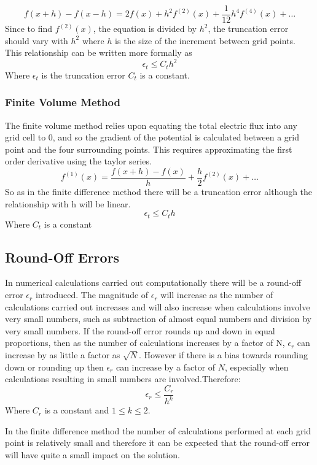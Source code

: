 \documentclass[aps,twocolumn,pre,nofootinbib,10pt]{revtex4-1}
\begin{document}
\[f(x+h)-f(x-h) = 2f(x) + h^2f^{(2)}(x) + \frac{1}{12}h^4f^{(4)}(x) + \dots \]
Since to find \(f^{(2)}(x) \), the equation is divided by \(h^2\), the truncation error should vary with \(h^2\) where \(h\) is the size of the increment between grid points. This relationship can be written more formally as
\[\epsilon_{t} \leq C_th^2 \]
Where \(\epsilon_{t}\) is the truncation error \(C_t\) is a constant.



\subsubsection{Finite Volume Method}

The finite volume method relies upon equating the total electric flux into any grid cell to 0, and so the gradient of the potential is calculated between a grid point and the four surrounding points. This requires approximating the first order derivative using the taylor series.
\[f^{(1)}(x) = \frac{f(x+h) - f(x)}{h} + \frac{h}{2}f^{(2)}(x) + \dots\]
So as in the finite difference method there will be a truncation error although the relationship with h will be linear.
\[\epsilon_t \leq C_th \]
Where \(C_t\) is a constant



\subsection{Round-Off Errors}

In numerical calculations carried out computationally there will be a round-off error \(\epsilon_r\) introduced. The magnitude of \(\epsilon_r\) will increase as the number of calculations carried out increases and will also increase when calculations involve very small numbers, such as subtraction of almost equal numbers and division by very small numbers. If the round-off error rounds up and down in equal proportions, then as the number of calculations increases by a factor of N, \(\epsilon_r\) can increase by as little a factor as \(\sqrt{N}.\) However if there is a bias towards rounding down or rounding up then \(\epsilon_r\) can increase by a factor of \(N\), especially when calculations resulting in small numbers are involved.Therefore: 
\[\epsilon_r \leq \frac{C_r}{h^k} \]\cite[p.~29]{recipes_c}
Where \(C_r\) is a constant and \(1 \leq k \leq 2\).

In the finite difference method the number of calculations performed at each grid point is relatively small and therefore it can be expected that the round-off error will have quite a small impact on the solution. 
\end{document}
